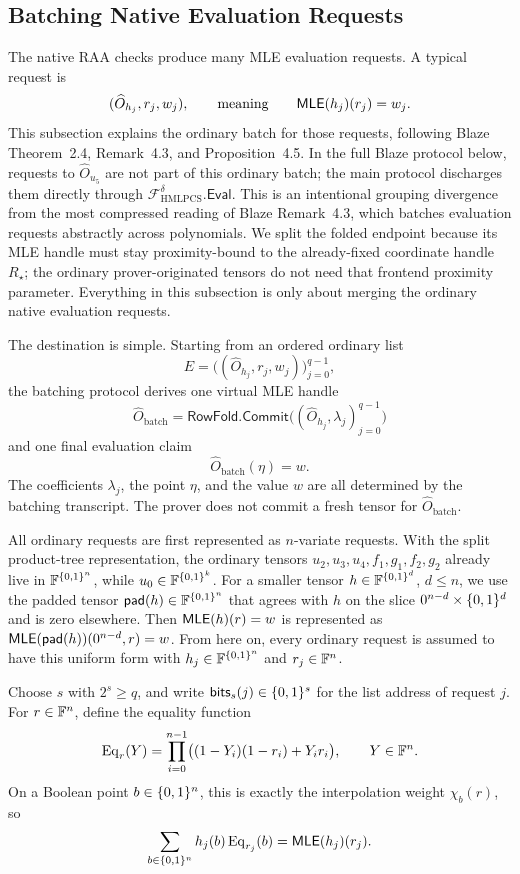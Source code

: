 \subsection{Batching Native Evaluation Requests}

The native RAA checks produce many MLE evaluation requests.  A typical request
is
\[
  (\widehat O_{h_j},r_j,w_j),
  \qquad\text{meaning}\qquad
  \mathsf{MLE}(h_j)(r_j)=w_j .
\]
This subsection explains the ordinary batch for those requests, following
Blaze Theorem~2.4, Remark~4.3, and Proposition~4.5.  In the full Blaze
protocol below, requests to \(\widehat O_{u_5}\) are not part of this ordinary
batch; the main protocol discharges them directly through
\(\mathcal F_{\mathrm{HMLPCS}}^\delta.\mathsf{Eval}\).  This is an intentional
grouping divergence from the most compressed reading of Blaze Remark~4.3, which
batches evaluation requests abstractly across polynomials.  We split the folded
endpoint because its MLE handle must stay proximity-bound to the already-fixed
coordinate handle \(R_\star\); the ordinary prover-originated tensors do not
need that frontend proximity parameter.  Everything in this subsection is only
about merging the ordinary native evaluation requests.

The destination is simple.  Starting from an ordered ordinary list
\[
  E=\bigl((\widehat O_{h_j},r_j,w_j)\bigr)_{j=0}^{q-1},
\]
the batching protocol derives one virtual MLE handle
\[
  \widehat O_{\mathrm{batch}}
  =
  \mathsf{RowFold.Commit}
  \bigl((\widehat O_{h_j},\lambda_j)_{j=0}^{q-1}\bigr)
\]
and one final evaluation claim
\[
  \widehat O_{\mathrm{batch}}(\eta)
  =
  w.
\]
The coefficients \(\lambda_j\), the point \(\eta\), and the value \(w\) are all
determined by the batching transcript.  The prover does not commit a fresh
tensor for \(\widehat O_{\mathrm{batch}}\).

All ordinary requests are first represented as \(n\)-variate requests.  With the
split product-tree representation, the ordinary tensors
\(u_2,u_3,u_4,f_1,g_1,f_2,g_2\) already live in \(\mathbb{F}^{\{0,1\}^n}\), while
\(u_0\in\mathbb{F}^{\{0,1\}^k}\).  For a smaller tensor \(h\in\mathbb{F}^{\{0,1\}^d}\), \(d\le n\), we
use the padded tensor \(\mathsf{pad}(h)\in\mathbb{F}^{\{0,1\}^n}\) that agrees with \(h\) on
the slice \(0^{n-d}\times\{0,1\}^d\) and is zero elsewhere.  Then
\(\mathsf{MLE}(h)(r)=w\) is represented as
\(\mathsf{MLE}(\mathsf{pad}(h))(0^{n-d},r)=w\).  From here on, every ordinary request is
assumed to have this uniform form with \(h_j\in\mathbb{F}^{\{0,1\}^n}\) and
\(r_j\in\mathbb{F}^n\).

Choose \(s\) with \(2^s\ge q\), and write
\(\mathsf{bits}_s(j)\in\{0,1\}^s\) for the list address of request \(j\).  For
\(r\in\mathbb{F}^n\), define the equality function
\[
  \mathrm{Eq}_r(Y)
  =
  \prod_{i=0}^{n-1}\bigl((1-Y_i)(1-r_i)+Y_i r_i\bigr),
  \qquad Y\in\mathbb{F}^n.
\]
On a Boolean point \(b\in\{0,1\}^n\), this is exactly the interpolation weight
\(\chi_b(r)\), so
\[
  \sum_{b\in\{0,1\}^n} h_j(b)\,\mathrm{Eq}_{r_j}(b)
  =
  \mathsf{MLE}(h_j)(r_j).
\]

